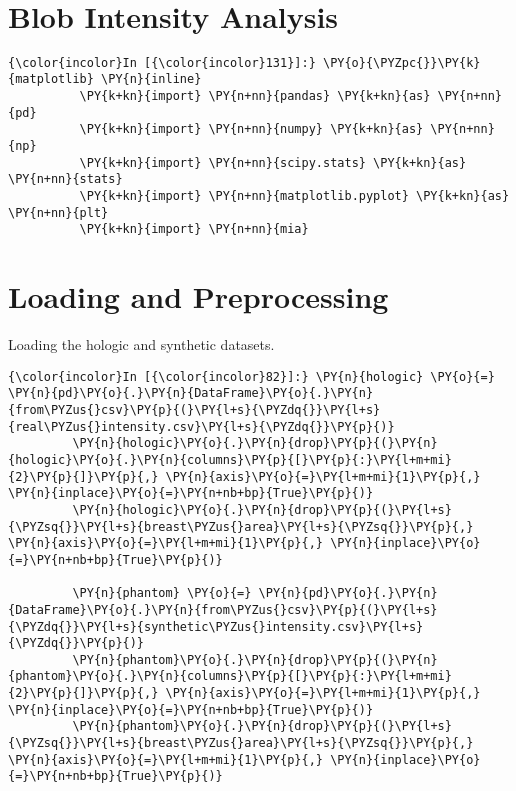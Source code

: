     \begin{center}
    \end{center}
    { \hspace*{\fill} \\}
    

\section*{Blob Intensity Analysis}




    \begin{Verbatim}[commandchars=\\\{\}]
{\color{incolor}In [{\color{incolor}131}]:} \PY{o}{\PYZpc{}}\PY{k}{matplotlib} \PY{n}{inline}
          \PY{k+kn}{import} \PY{n+nn}{pandas} \PY{k+kn}{as} \PY{n+nn}{pd}
          \PY{k+kn}{import} \PY{n+nn}{numpy} \PY{k+kn}{as} \PY{n+nn}{np}
          \PY{k+kn}{import} \PY{n+nn}{scipy.stats} \PY{k+kn}{as} \PY{n+nn}{stats}
          \PY{k+kn}{import} \PY{n+nn}{matplotlib.pyplot} \PY{k+kn}{as} \PY{n+nn}{plt}
          \PY{k+kn}{import} \PY{n+nn}{mia}
\end{Verbatim}

    \section{Loading and Preprocessing}\label{loading-and-preprocessing}

    Loading the hologic and synthetic datasets.

    \begin{Verbatim}[commandchars=\\\{\}]
{\color{incolor}In [{\color{incolor}82}]:} \PY{n}{hologic} \PY{o}{=} \PY{n}{pd}\PY{o}{.}\PY{n}{DataFrame}\PY{o}{.}\PY{n}{from\PYZus{}csv}\PY{p}{(}\PY{l+s}{\PYZdq{}}\PY{l+s}{real\PYZus{}intensity.csv}\PY{l+s}{\PYZdq{}}\PY{p}{)}
         \PY{n}{hologic}\PY{o}{.}\PY{n}{drop}\PY{p}{(}\PY{n}{hologic}\PY{o}{.}\PY{n}{columns}\PY{p}{[}\PY{p}{:}\PY{l+m+mi}{2}\PY{p}{]}\PY{p}{,} \PY{n}{axis}\PY{o}{=}\PY{l+m+mi}{1}\PY{p}{,} \PY{n}{inplace}\PY{o}{=}\PY{n+nb+bp}{True}\PY{p}{)}
         \PY{n}{hologic}\PY{o}{.}\PY{n}{drop}\PY{p}{(}\PY{l+s}{\PYZsq{}}\PY{l+s}{breast\PYZus{}area}\PY{l+s}{\PYZsq{}}\PY{p}{,} \PY{n}{axis}\PY{o}{=}\PY{l+m+mi}{1}\PY{p}{,} \PY{n}{inplace}\PY{o}{=}\PY{n+nb+bp}{True}\PY{p}{)}

         \PY{n}{phantom} \PY{o}{=} \PY{n}{pd}\PY{o}{.}\PY{n}{DataFrame}\PY{o}{.}\PY{n}{from\PYZus{}csv}\PY{p}{(}\PY{l+s}{\PYZdq{}}\PY{l+s}{synthetic\PYZus{}intensity.csv}\PY{l+s}{\PYZdq{}}\PY{p}{)}
         \PY{n}{phantom}\PY{o}{.}\PY{n}{drop}\PY{p}{(}\PY{n}{phantom}\PY{o}{.}\PY{n}{columns}\PY{p}{[}\PY{p}{:}\PY{l+m+mi}{2}\PY{p}{]}\PY{p}{,} \PY{n}{axis}\PY{o}{=}\PY{l+m+mi}{1}\PY{p}{,} \PY{n}{inplace}\PY{o}{=}\PY{n+nb+bp}{True}\PY{p}{)}
         \PY{n}{phantom}\PY{o}{.}\PY{n}{drop}\PY{p}{(}\PY{l+s}{\PYZsq{}}\PY{l+s}{breast\PYZus{}area}\PY{l+s}{\PYZsq{}}\PY{p}{,} \PY{n}{axis}\PY{o}{=}\PY{l+m+mi}{1}\PY{p}{,} \PY{n}{inplace}\PY{o}{=}\PY{n+nb+bp}{True}\PY{p}{)}
\end{Verbatim}

